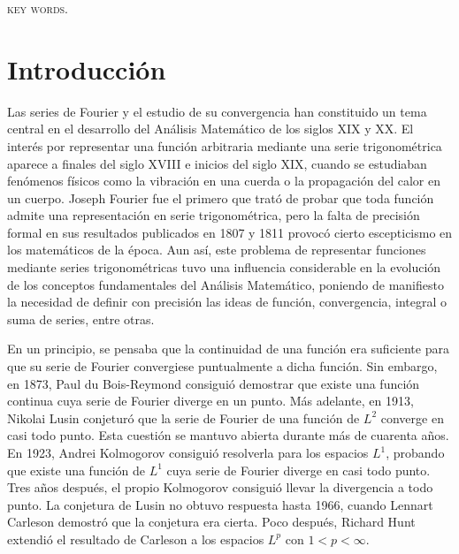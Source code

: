 \documentclass[a4paper, 12pt, oneside]{book}
\begin{document}
\textsc{key words.}



\chapter*{Introducción}

Las series de Fourier y el estudio de su convergencia han constituido un tema central en el desarrollo del Análisis Matemático de los siglos XIX y XX. El interés por representar una función arbitraria mediante una serie trigonométrica aparece a finales del siglo XVIII e inicios del siglo XIX, cuando se estudiaban fenómenos físicos como la vibración en una cuerda o la propagación del calor en un cuerpo. Joseph Fourier fue el primero que trató de probar que toda función admite una representación en serie trigonométrica, pero la falta de precisión formal en sus resultados publicados en 1807 y 1811 provocó cierto escepticismo en los matemáticos de la época. Aun así, este problema de representar funciones mediante series trigonométricas tuvo una influencia considerable en la evolución de los conceptos fundamentales del Análisis Matemático, poniendo de manifiesto la necesidad de definir con precisión las ideas de función, convergencia, integral o suma de series, entre otras.

En un principio, se pensaba que la continuidad de una función era suficiente para que su serie de Fourier convergiese puntualmente a dicha función. Sin embargo, en 1873, Paul du Bois-Reymond consiguió demostrar que existe una función continua cuya serie de Fourier diverge en un punto. Más adelante, en 1913, Nikolai Lusin conjeturó que la serie de Fourier de una función de $L^2$ converge en casi todo punto. Esta cuestión se mantuvo abierta durante más de cuarenta años. En 1923, Andrei Kolmogorov consiguió resolverla para los espacios $L^1$, probando que existe una función de $L^1$ cuya serie de Fourier diverge en casi todo punto. Tres años después, el propio Kolmogorov consiguió llevar la divergencia a todo punto. La conjetura de Lusin no obtuvo respuesta hasta 1966, cuando Lennart Carleson demostró que la conjetura era cierta. Poco después, Richard Hunt extendió el resultado de Carleson a los espacios $L^p$ con $1 < p < \infty$.
\end{document}
